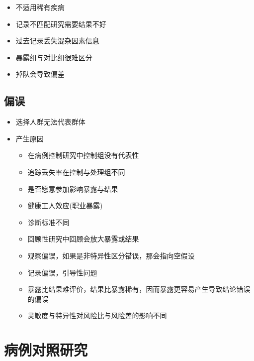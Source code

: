 \documentclass[]{book}
\providecommand{\tightlist}{%
  \setlength{\itemsep}{0pt}\setlength{\parskip}{0pt}}
\begin{document}
\begin{itemize}
\tightlist
\item
  不适用稀有疾病
\item
  记录不匹配研究需要结果不好
\item
  过去记录丢失混杂因素信息
\item
  暴露组与对比组很难区分
\item
  掉队会导致偏差
\end{itemize}

\hypertarget{ux504fux8bef}{%
\subsection{偏误}\label{ux504fux8bef}}

\begin{itemize}
\tightlist
\item
  选择人群无法代表群体
\item
  产生原因

  \begin{itemize}
  \tightlist
  \item
    在病例控制研究中控制组没有代表性
  \item
    追踪丢失率在控制与处理组不同
  \item
    是否愿意参加影响暴露与结果
  \item
    健康工人效应(职业暴露)
  \item
    诊断标准不同
  \item
    回顾性研究中回顾会放大暴露或结果
  \item
    观察偏误，如果是非特异性区分错误，那会指向空假设
  \item
    记录偏误，引导性问题
  \item
    暴露比结果难评价，结果比暴露稀有，因而暴露更容易产生导致结论错误的偏误
  \item
    灵敏度与特异性对风险比与风险差的影响不同
  \end{itemize}
\end{itemize}

\hypertarget{ux75c5ux4f8bux5bf9ux7167ux7814ux7a76}{%
\section{病例对照研究}\label{ux75c5ux4f8bux5bf9ux7167ux7814ux7a76}}
\end{document}
